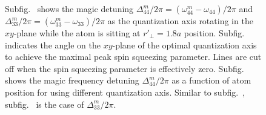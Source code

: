 \documentclass[preprint,aps,pra,onecolumn]{revtex4-1} %
\begin{document}
\begin{figure}
\begin{minipage}{.49\linewidth}
\end{minipage}
\begin{minipage}{.49\linewidth}
\centering
{}
\end{minipage}
\caption{Subfig.~\protect{} shows the magic detuning $ \Delta_{44}^m/2\pi=(\omega_{44}^m-\omega_{44})/2\pi $ and $ \Delta_{33}^m/2\pi=(\omega_{33}^m-\omega_{33})/2\pi $ as the quantization axis rotating in the $ xy $-plane while the atom is sitting at $ r'\!_\perp=1.8a $ position. Subfig.~\protect{} indicates the angle on the $ xy $-plane of the optimal quantization axis to achieve the maximal peak spin squeezing parameter. Lines are cut off when the spin squeezing parameter is effectively zero. Subfig.~\protect{} shows the magic frequency detuning $ \Delta_{44}^m/2\pi $ as a function of atom position for using different quantization axis. Similar to subfig.~\protect{}, subfig.~\protect{} is the case of $ \Delta_{33}^m/2\pi $. }\label{fig:optimalq_domega_magics}

\end{figure}
\end{document}
